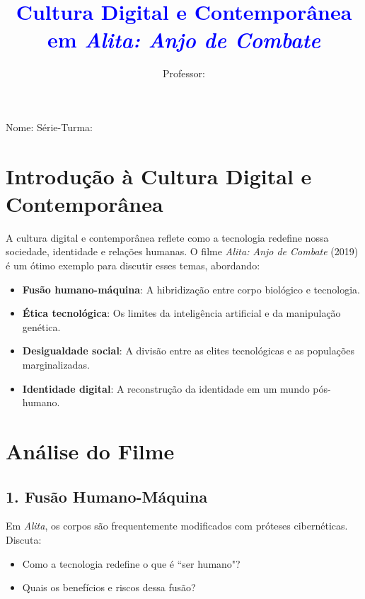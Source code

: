 \documentclass[12pt]{article}
\title{\textcolor{blue}{Cultura Digital e Contemporânea em \textit{Alita: Anjo de Combate}}}
\author{Professor: \underline{\hspace{4cm}}}
\date{}
\begin{document}
\maketitle

\begin{center}
\large{Nome: \underline{\hspace{8cm}} \quad Série-Turma: \underline{\hspace{3cm}}}
\end{center}

\begin{multicols}{2}

\section*{Introdução à Cultura Digital e Contemporânea}

A cultura digital e contemporânea reflete como a tecnologia redefine nossa sociedade, identidade e relações humanas. O filme \textit{Alita: Anjo de Combate} (2019) é um ótimo exemplo para discutir esses temas, abordando:

\begin{itemize}
    \item \textbf{Fusão humano-máquina}: A hibridização entre corpo biológico e tecnologia.
    \item \textbf{Ética tecnológica}: Os limites da inteligência artificial e da manipulação genética.
    \item \textbf{Desigualdade social}: A divisão entre as elites tecnológicas e as populações marginalizadas.
    \item \textbf{Identidade digital}: A reconstrução da identidade em um mundo pós-humano.
\end{itemize}

\section*{Análise do Filme}

\subsection*{1. Fusão Humano-Máquina}
Em \textit{Alita}, os corpos são frequentemente modificados com próteses cibernéticas. Discuta:
\begin{itemize}
    \item Como a tecnologia redefine o que é ``ser humano"?
    \item Quais os benefícios e riscos dessa fusão?
\end{itemize}


\end{multicols}
\end{document}

